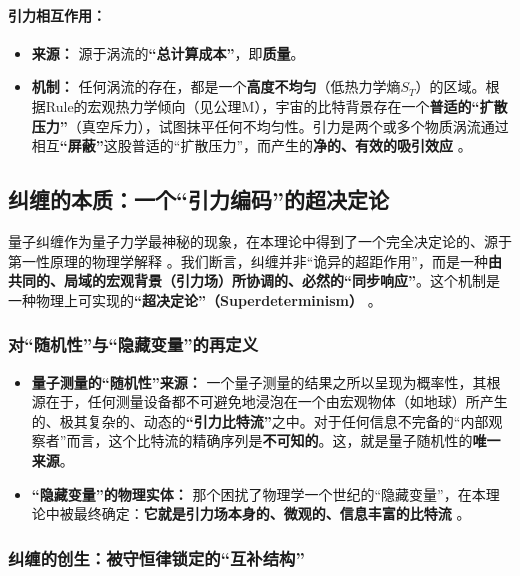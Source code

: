 \documentclass[11pt, a4paper]{article}
\begin{document}
\paragraph{引力相互作用：}
\begin{itemize}
    \item \textbf{来源：} 源于涡流的\textbf{“总计算成本”}，即\textbf{质量}。
    \item \textbf{机制：} 任何涡流的存在，都是一个\textbf{高度不均匀}（低热力学熵$S_T$）的区域。根据Rule的宏观热力学倾向（见公理M），宇宙的比特背景存在一个\textbf{普适的“扩散压力”}（真空斥力），试图抹平任何不均匀性。引力是两个或多个物质涡流通过相互\textbf{“屏蔽”}这股普适的“扩散压力”，而产生的\textbf{净的、有效的吸引效应} \cite{Newton1687}。
\end{itemize}

\subsection{纠缠的本质：一个“引力编码”的超决定论}

量子纠缠作为量子力学最神秘的现象，在本理论中得到了一个完全决定论的、源于第一性原理的物理学解释 \cite{Bell1964}。我们断言，纠缠并非“诡异的超距作用”，而是一种\textbf{由共同的、局域的宏观背景（引力场）所协调的、必然的“同步响应”}。这个机制是一种物理上可实现的\textbf{“超决定论”（Superdeterminism）} \cite{Bohm1952}。

\subsubsection{对“随机性”与“隐藏变量”的再定义}

\begin{itemize}
    \item \textbf{量子测量的“随机性”来源：}
    一个量子测量的结果之所以呈现为概率性，其根源在于，任何测量设备都不可避免地浸泡在一个由宏观物体（如地球）所产生的、极其复杂的、动态的\textbf{“引力比特流”}之中。对于任何信息不完备的“内部观察者”而言，这个比特流的精确序列是\textbf{不可知的}。这，就是量子随机性的\textbf{唯一来源}。

    \item \textbf{“隐藏变量”的物理实体：}
    那个困扰了物理学一个世纪的“隐藏变量”，在本理论中被最终确定：\textbf{它就是引力场本身的、微观的、信息丰富的比特流} \cite{Bohm1952}。
\end{itemize}

\subsubsection{纠缠的创生：被守恒律锁定的“互补结构”}
\end{document}
